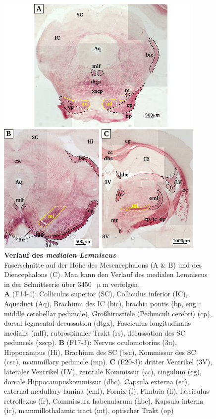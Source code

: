 \documentclass[12pt,a4paper,pdftex]{article}
\begin{document}
\begin{figure}[H]
    \centering
    \includegraphics[width = 0.9\textwidth] {pictures/somatosensory/medial_lemniscus.png}
    \caption[Verlauf des \textit{medialen Lemniscus}]{\small{\textbf{Verlauf des \textit{medialen Lemniscus}}\\
    Faserschnitte auf der Höhe des Mesencephalons (A \& B) und des Diencephalons (C). Man kann den Verlauf des medialen Lemniscus in der Schnittserie über 3450~$\upmu$m verfolgen.\\
    \textbf{A} (F14-4): Colliculus superior (SC), Colliculus inferior (IC), Aqueduct (Aq), Brachium des IC (bic), brachia pontis (bp, eng.: middle cerebellar peduncle), Großhirnstiele (Pedunculi cerebri) (cp), dorsal tegmental decussation (dtgx), Fasciculus longitudinalis medialis (mlf), rubrospinaler Trakt (rs), decussation des SC peduncels (xscp).
    \textbf{B} (F17-3): Nervus oculomotorius (3n), Hippocampus (Hi), Brachium des SC (bsc), Kommissur des SC (csc), mammillary peduncle (mp).
    \textbf{C} (F20-3): dritter Ventrikel (3V), lateraler Ventrikel (LV), zentrale Kommissur (cc), cingulum (cg), dorsale Hippocampuskommissur (dhc), Capsula externa (ec), external medullary lamina (eml), Fornix (f), Fimbria (fi), fasciculus retroflexus (fr), Commissura habenularum (hbc), Kapsula interna (ic), mammillothalamic tract (mt), optischer Trakt (op)}}
    \label{fig:medialer_lemniscus}
\end{figure}
\end{document}
